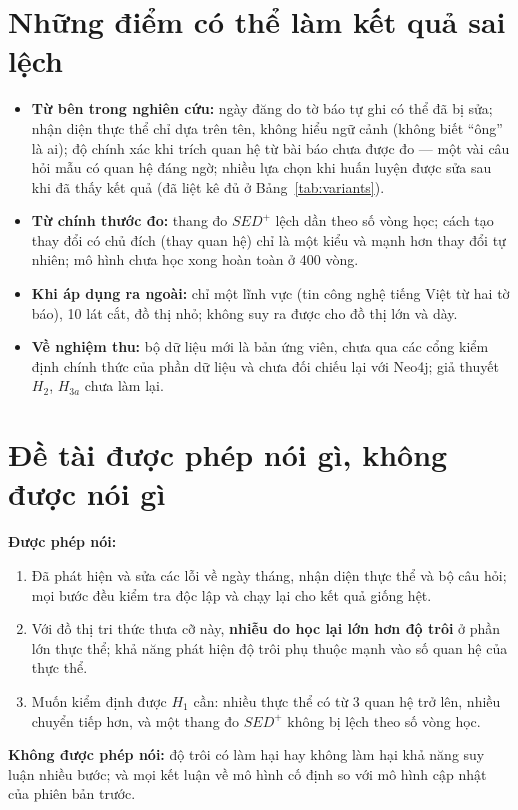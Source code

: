 \section{Những điểm có thể làm kết quả sai lệch}
\label{sec:threats}
\begin{itemize}
    \item \textbf{Từ bên trong nghiên cứu:} ngày đăng do tờ báo tự ghi có thể đã bị sửa; nhận diện thực thể chỉ dựa trên tên, không hiểu ngữ cảnh (không biết ``ông'' là ai); độ chính xác khi trích quan hệ từ bài báo chưa được đo --- một vài câu hỏi mẫu có quan hệ đáng ngờ; nhiều lựa chọn khi huấn luyện được sửa sau khi đã thấy kết quả (đã liệt kê đủ ở Bảng~\ref{tab:variants}).
    \item \textbf{Từ chính thước đo:} thang đo $SED^+$ lệch dần theo số vòng học; cách tạo thay đổi có chủ đích (thay quan hệ) chỉ là một kiểu và mạnh hơn thay đổi tự nhiên; mô hình chưa học xong hoàn toàn ở 400 vòng.
    \item \textbf{Khi áp dụng ra ngoài:} chỉ một lĩnh vực (tin công nghệ tiếng Việt từ hai tờ báo), 10 lát cắt, đồ thị nhỏ; không suy ra được cho đồ thị lớn và dày.
    \item \textbf{Về nghiệm thu:} bộ dữ liệu mới là bản ứng viên, chưa qua các cổng kiểm định chính thức của phần dữ liệu và chưa đối chiếu lại với Neo4j; giả thuyết $H_2$, $H_{3a}$ chưa làm lại.
\end{itemize}

\section{Đề tài được phép nói gì, không được nói gì}
\label{sec:defense}
\textbf{Được phép nói:}
\begin{enumerate}
    \item Đã phát hiện và sửa các lỗi về ngày tháng, nhận diện thực thể và bộ câu hỏi; mọi bước đều kiểm tra độc lập và chạy lại cho kết quả giống hệt.
    \item Với đồ thị tri thức thưa cỡ này, \textbf{nhiễu do học lại lớn hơn độ trôi} ở phần lớn thực thể; khả năng phát hiện độ trôi phụ thuộc mạnh vào số quan hệ của thực thể.
    \item Muốn kiểm định được $H_1$ cần: nhiều thực thể có từ 3 quan hệ trở lên, nhiều chuyển tiếp hơn, và một thang đo $SED^+$ không bị lệch theo số vòng học.
\end{enumerate}
\textbf{Không được phép nói:} độ trôi có làm hại hay không làm hại khả năng suy luận nhiều bước; và mọi kết luận về mô hình cố định so với mô hình cập nhật của phiên bản trước.
